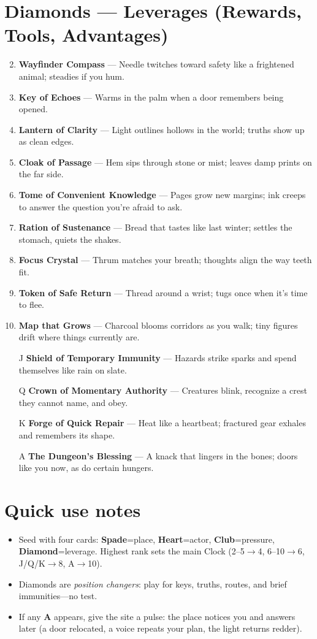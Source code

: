 \section*{Diamonds --- Leverages (Rewards, Tools, Advantages)}
\label{sec:dungeon-leverages}
\begin{enumerate}
\setcounter{enumi}{1}
\item \textbf{Wayfinder Compass} — Needle twitches toward safety like a frightened animal; steadies if you hum.
\item \textbf{Key of Echoes} — Warms in the palm when a door remembers being opened.
\item \textbf{Lantern of Clarity} — Light outlines hollows in the world; truths show up as clean edges.
\item \textbf{Cloak of Passage} — Hem sips through stone or mist; leaves damp prints on the far side.
\item \textbf{Tome of Convenient Knowledge} — Pages grow new margins; ink creeps to answer the question you’re afraid to ask.
\item \textbf{Ration of Sustenance} — Bread that tastes like last winter; settles the stomach, quiets the shakes.
\item \textbf{Focus Crystal} — Thrum matches your breath; thoughts align the way teeth fit.
\item \textbf{Token of Safe Return} — Thread around a wrist; tugs once when it’s time to flee.
\item \textbf{Map that Grows} — Charcoal blooms corridors as you walk; tiny figures drift where things currently are.
\item[J] \textbf{Shield of Temporary Immunity} — Hazards strike sparks and spend themselves like rain on slate.
\item[Q] \textbf{Crown of Momentary Authority} — Creatures blink, recognize a crest they cannot name, and obey.
\item[K] \textbf{Forge of Quick Repair} — Heat like a heartbeat; fractured gear exhales and remembers its shape.
\item[A] \textbf{The Dungeon’s Blessing} — A knack that lingers in the bones; doors like you now, as do certain hungers.
\end{enumerate}

\section*{Quick use notes}
\label{sec:dungeon-quick-use}
\begin{itemize}
\item Seed with four cards: \textbf{Spade}=place, \textbf{Heart}=actor, \textbf{Club}=pressure, \textbf{Diamond}=leverage. Highest rank sets the main Clock (2--5$\rightarrow$4, 6--10$\rightarrow$6, J/Q/K$\rightarrow$8, A$\rightarrow$10).
\item Diamonds are \emph{position changers}: play for keys, truths, routes, and brief immunities—no test.
\item If any \textbf{A} appears, give the site a pulse: the place notices you and answers later (a door relocated, a voice repeats your plan, the light returns redder).
\end{itemize}

